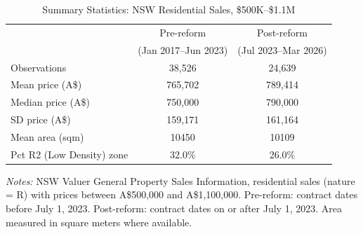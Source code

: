 \begin{table}[t]
\centering
\caption{Summary Statistics: NSW Residential Sales, \$500K--\$1.1M}
\label{tab:summary}
\begin{tabular}{lcc}
\hline\hline
& Pre-reform & Post-reform \\
& (Jan 2017--Jun 2023) & (Jul 2023--Mar 2026) \\
\hline
Observations & 38,526 & 24,639 \\
Mean price (A\$) & 765,702 & 789,414 \\
Median price (A\$) & 750,000 & 790,000 \\
SD price (A\$) & 159,171 & 161,164 \\
Mean area (sqm) & 10450 & 10109 \\
Pct R2 (Low Density) zone & 32.0\% & 26.0\% \\
\hline\hline
\end{tabular}
\begin{tablenotes}[flushleft]\small
\item \textit{Notes:} NSW Valuer General Property Sales Information, residential sales (nature = R) with prices between A\$500,000 and A\$1,100,000. Pre-reform: contract dates before July 1, 2023. Post-reform: contract dates on or after July 1, 2023. Area measured in square meters where available.
\end{tablenotes}
\end{table}

